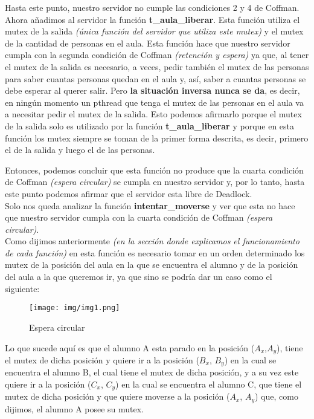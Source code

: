 Hasta este punto, nuestro servidor no cumple las condiciones 2 y 4 de Coffman.\\

Ahora añadimos al servidor la función \textbf{t\_aula\_liberar}.
Esta función utiliza el mutex de la salida \textit{(única función del servidor que utiliza este mutex)} y el mutex de la cantidad de personas en el aula.
Esta función hace que nuestro servidor cumpla con la segunda condición de Coffman \textit{(retención y espera)} ya que, al tener el mutex de la salida es necesario, a veces, pedir también el mutex de las personas para saber cuantas personas quedan en el aula y, así, saber a cuantas personas se debe esperar al querer salir.
Pero \textbf{la situación inversa nunca se da}, es decir, en ningún momento un pthread que tenga el mutex de las personas en el aula va a necesitar pedir el mutex de la salida.
Esto podemos afirmarlo porque el mutex de la salida solo es utilizado por la función \textbf{t\_aula\_liberar} y porque en esta función los mutex siempre se toman de la primer forma descrita, es decir, primero el de la salida y luego el de las personas.

Entonces, podemos concluir que esta función no produce que la cuarta condición de Coffman \textit{(espera circular)} se cumpla en nuestro servidor y, por lo tanto, hasta este punto podemos afirmar que el servidor esta libre de Deadlock.\\

Solo nos queda analizar la función \textbf{intentar\_moverse} y ver que esta no hace que nuestro servidor cumpla con la cuarta condición de Coffman \textit{(espera circular)}.\\

Como dijimos anteriormente \textit{(en la sección donde explicamos el funcionamiento de cada función)} en esta función es necesario tomar en un orden determinado los mutex de la posición del aula en la que se encuentra el alumno y de la posición del aula a la que queremos ir, ya que sino se podría dar un caso como el siguiente:

\begin{figure}[H]
\begin{center}
\texttt{[image: img/img1.png]}
     \caption{Espera circular}
\end{center}
\end{figure}

Lo que sucede aquí es que el alumno A esta parado en la posición ($A_x$,$A_y$), tiene el mutex de dicha posición y quiere ir a la posición ($B_x$, $B_y$) en la cual se encuentra el alumno B, el cual tiene el mutex de dicha posición, y a su vez este quiere ir a la posición ($C_x$, $C_y$) en la cual se encuentra el alumno C, que tiene el mutex de dicha posición y que quiere moverse a la posición ($A_x$, $A_y$) que, como dijimos, el alumno A posee su mutex.\\

